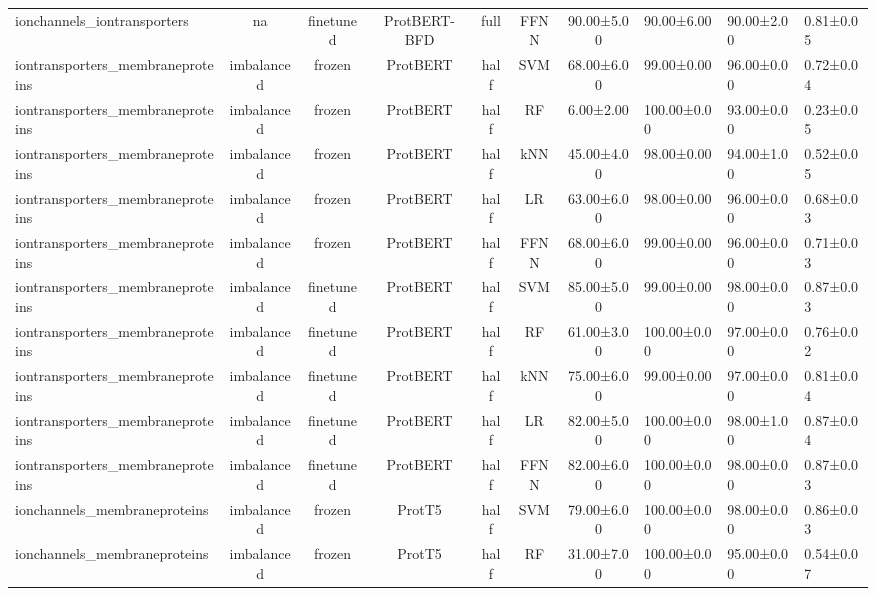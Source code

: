 \begin{tabular}{lcccccc}
     ionchannels\_iontransporters &         na &      finetuned & ProtBERT-BFD &      full &       FFNN &  90.00±5.00 &  90.00±6.00 &  90.00±2.00 & 0.81±0.05 \\
iontransporters\_membraneproteins & imbalanced &         frozen &     ProtBERT &      half &        SVM &  68.00±6.00 &  99.00±0.00 &  96.00±0.00 & 0.72±0.04 \\
iontransporters\_membraneproteins & imbalanced &         frozen &     ProtBERT &      half &         RF &   6.00±2.00 & 100.00±0.00 &  93.00±0.00 & 0.23±0.05 \\
iontransporters\_membraneproteins & imbalanced &         frozen &     ProtBERT &      half &        kNN &  45.00±4.00 &  98.00±0.00 &  94.00±1.00 & 0.52±0.05 \\
iontransporters\_membraneproteins & imbalanced &         frozen &     ProtBERT &      half &         LR &  63.00±6.00 &  98.00±0.00 &  96.00±0.00 & 0.68±0.03 \\
iontransporters\_membraneproteins & imbalanced &         frozen &     ProtBERT &      half &       FFNN &  68.00±6.00 &  99.00±0.00 &  96.00±0.00 & 0.71±0.03 \\
iontransporters\_membraneproteins & imbalanced &      finetuned &     ProtBERT &      half &        SVM &  85.00±5.00 &  99.00±0.00 &  98.00±0.00 & 0.87±0.03 \\
iontransporters\_membraneproteins & imbalanced &      finetuned &     ProtBERT &      half &         RF &  61.00±3.00 & 100.00±0.00 &  97.00±0.00 & 0.76±0.02 \\
iontransporters\_membraneproteins & imbalanced &      finetuned &     ProtBERT &      half &        kNN &  75.00±6.00 &  99.00±0.00 &  97.00±0.00 & 0.81±0.04 \\
iontransporters\_membraneproteins & imbalanced &      finetuned &     ProtBERT &      half &         LR &  82.00±5.00 & 100.00±0.00 &  98.00±1.00 & 0.87±0.04 \\
iontransporters\_membraneproteins & imbalanced &      finetuned &     ProtBERT &      half &       FFNN &  82.00±6.00 & 100.00±0.00 &  98.00±0.00 & 0.87±0.03 \\
    ionchannels\_membraneproteins & imbalanced &         frozen &       ProtT5 &      half &        SVM &  79.00±6.00 & 100.00±0.00 &  98.00±0.00 & 0.86±0.03 \\
    ionchannels\_membraneproteins & imbalanced &         frozen &       ProtT5 &      half &         RF &  31.00±7.00 & 100.00±0.00 &  95.00±0.00 & 0.54±0.07 \\

\end{tabular}
